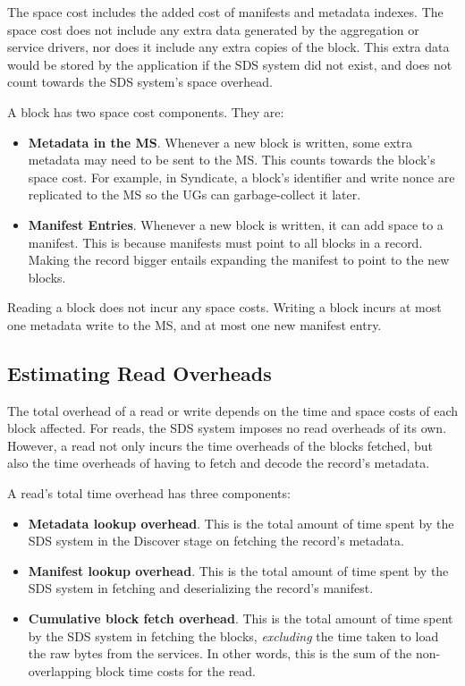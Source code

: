The space cost includes the added cost of manifests and metadata
indexes.  The space cost does not include any extra data generated by the
aggregation or service drivers, nor does it include any extra copies of the
block.  This extra data would be stored by the application if the SDS system did
not exist, and does not count towards the SDS system's space overhead.

A block has two space cost components.  They are:

\begin{itemize}
\item \textbf{Metadata in the MS}.  Whenever a new block is written, some extra
metadata may need to be sent to the MS.  This counts towards the block's space
cost.  For example, in Syndicate, a block's identifier
and write nonce are replicated to the MS so the UGs can garbage-collect it
later.

\item \textbf{Manifest Entries}.  Whenever a new block is written, it can add
space to a manifest.  This is because manifests must point to all blocks in a
record.  Making the record bigger entails expanding the manifest to point to the
new blocks.
\end{itemize}

Reading a block does not incur any space costs.  Writing a block incurs at most
one metadata write to the MS, and at most one new manifest entry.

\subsection{Estimating Read Overheads}

The total overhead of a read or write depends on the time and space costs of
each block affected.  For reads, the SDS system imposes no read overheads of its
own.  However, a read not only incurs the time overheads of
the blocks fetched, but also the time
overheads of having to fetch and decode the record's metadata.

A read's total time overhead has three components:

\begin{itemize}
\item \textbf{Metadata lookup overhead}.  This is the total amount of time spent by the
SDS system in the Discover stage on fetching the record's metadata.

\item \textbf{Manifest lookup overhead}.  This is the total amount of time spent by the
SDS system in fetching and deserializing the record's manifest.

\item \textbf{Cumulative block fetch overhead}.  This is the total amount of time spent
by the SDS system in fetching the blocks, \emph{excluding} the time taken to load the
raw bytes from the services.  In other words, this is the sum of
the non-overlapping block time costs for the read.

\end{itemize}

